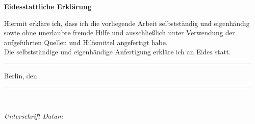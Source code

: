 \documentclass[12pt,a4paper,ngerman,twoside]{scrreprt}
\begin{document}
	\centering
	\vspace{5cm}
	{\Large\bfseries Eidesstattliche Erkl\"arung\par}
	\vspace{2cm}
	\raggedright
Hiermit erkl\"are ich, dass ich die vorliegende Arbeit selbstst\"andig und eigenh\"andig sowie ohne unerlaubte fremde Hilfe und ausschlie\ss lich unter Verwendung der aufgef\"uhrten Quellen und Hilfsmittel angefertigt habe.\\
\vspace{0.5cm}
Die selbstst\"andige und eigenh\"andige Anfertigung erkl\"are ich an Eides statt. 
	
	\vspace{2.2cm}
	
	\rule{0.3\textwidth}{0.4pt} Berlin, den \rule{0.3\textwidth}{0.4pt}\\
	{\itshape \hspace{1cm}Unterschrift \hspace{4.3cm} Datum \par}
	\vfill

	\vfill
	
\end{document}
